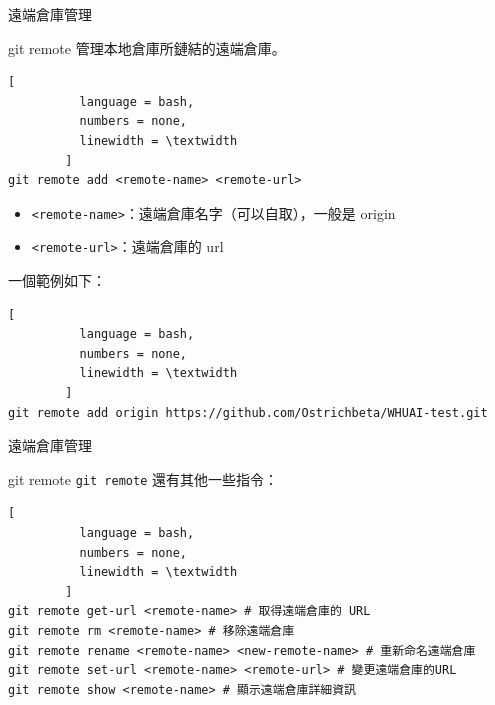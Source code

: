 \documentclass[xetex, unicode, 10pt, aspectratio=169]{beamer}
\begin{document}
\begin{frame}[fragile]{遠端倉庫管理}
    \begin{block}{git remote}
        管理本地倉庫所鏈結的遠端倉庫。
        \begin{lstlisting}[
          language = bash,
          numbers = none,
          linewidth = \textwidth
        ]
git remote add <remote-name> <remote-url>\end{lstlisting}

        \begin{itemize}
            \item
                \texttt{\textless{}remote-name\textgreater{}}：遠端倉庫名字（可以自取），一般是 origin
            \item \texttt{\textless{}remote-url\textgreater{}}：遠端倉庫的 url
        \end{itemize}
        \pause
        一個範例如下：
        \begin{lstlisting}[
          language = bash,
          numbers = none,
          linewidth = \textwidth
        ]
git remote add origin https://github.com/Ostrichbeta/WHUAI-test.git\end{lstlisting}
    \end{block}
\end{frame}

\begin{frame}[fragile]{遠端倉庫管理}
    \begin{block}{git remote}
        \texttt{git remote} 還有其他一些指令：
        \begin{lstlisting}[
          language = bash,
          numbers = none,
          linewidth = \textwidth
        ]
git remote get-url <remote-name> # 取得遠端倉庫的 URL
git remote rm <remote-name> # 移除遠端倉庫
git remote rename <remote-name> <new-remote-name> # 重新命名遠端倉庫
git remote set-url <remote-name> <remote-url> # 變更遠端倉庫的URL
git remote show <remote-name> # 顯示遠端倉庫詳細資訊\end{lstlisting}
    \end{block}
\end{frame}
\end{document}
